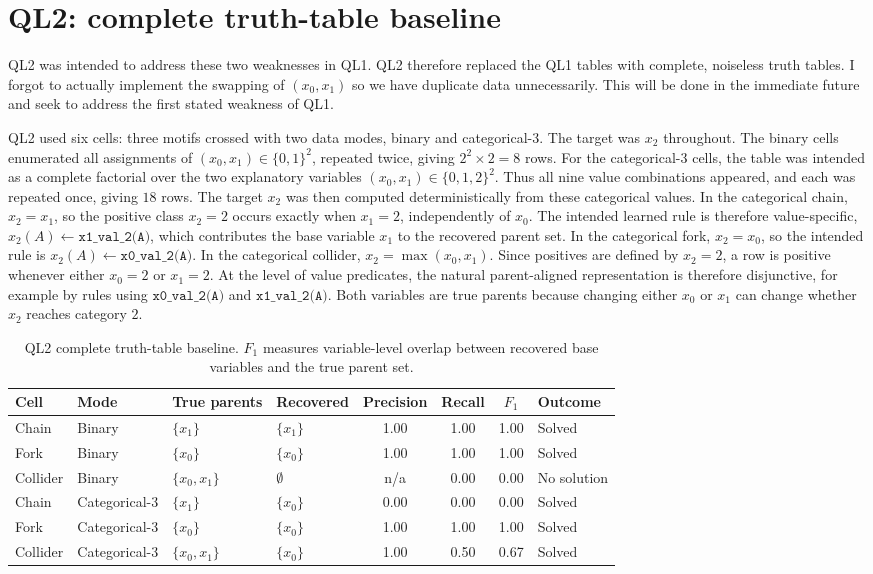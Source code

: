 \section{QL2: complete truth-table baseline}
QL2 was intended to address these two weaknesses in QL1. QL2 therefore replaced the QL1 tables with complete, noiseless truth tables. I forgot to actually implement the swapping of \((x_0,x_1)\) so we have duplicate data unnecessarily. This will be done in the immediate future and seek to address the first stated weakness of QL1. 

QL2 used six cells: three motifs crossed with two data modes, binary and categorical-3. The target was \(x_2\) throughout. The binary cells enumerated all assignments of \((x_0,x_1)\in\{0,1\}^2\), repeated twice, giving \(2^2\times 2=8\) rows. For the categorical-3 cells, the table was intended as a complete factorial over the two explanatory variables \((x_0,x_1)\in\{0,1,2\}^2\). Thus all nine value combinations appeared, and each was repeated once, giving \(18\) rows. The target \(x_2\) was then computed deterministically from these categorical values. In the categorical chain, \(x_2=x_1\), so the positive class \(x_2=2\) occurs exactly when \(x_1=2\), independently of \(x_0\). The intended learned rule is therefore value-specific, \(x_2(A)\leftarrow \texttt{x1\_val\_2(A)}\), which contributes the base variable \(x_1\) to the recovered parent set. In the categorical fork, \(x_2=x_0\), so the intended rule is \(x_2(A)\leftarrow \texttt{x0\_val\_2(A)}\). In the categorical collider, \(x_2=\max(x_0,x_1)\). Since positives are defined by \(x_2=2\), a row is positive whenever either \(x_0=2\) or \(x_1=2\). At the level of value predicates, the natural parent-aligned representation is therefore disjunctive, for example by rules using \(\texttt{x0\_val\_2(A)}\) and \(\texttt{x1\_val\_2(A)}\). Both variables are true parents because changing either \(x_0\) or \(x_1\) can change whether \(x_2\) reaches category \(2\).

\begin{table}[htbp]
\centering
\caption{QL2 complete truth-table baseline. \(F_1\) measures variable-level overlap between recovered base variables and the true parent set.}
\label{tab:ql2-results}
\begin{tabular}{llllcccl}
\toprule
Cell & Mode & True parents & Recovered & Precision & Recall & \(F_1\) & Outcome \\
\midrule
Chain & Binary & \(\{x_1\}\) & \(\{x_1\}\) & 1.00 & 1.00 & 1.00 & Solved \\
Fork & Binary & \(\{x_0\}\) & \(\{x_0\}\) & 1.00 & 1.00 & 1.00 & Solved \\
Collider & Binary & \(\{x_0,x_1\}\) & \(\emptyset\) & n/a & 0.00 & 0.00 & No solution \\
Chain & Categorical-3 & \(\{x_1\}\) & \(\{x_0\}\) & 0.00 & 0.00 & 0.00 & Solved \\
Fork & Categorical-3 & \(\{x_0\}\) & \(\{x_0\}\) & 1.00 & 1.00 & 1.00 & Solved \\
Collider & Categorical-3 & \(\{x_0,x_1\}\) & \(\{x_0\}\) & 1.00 & 0.50 & 0.67 & Solved \\
\bottomrule
\end{tabular}
\end{table}

